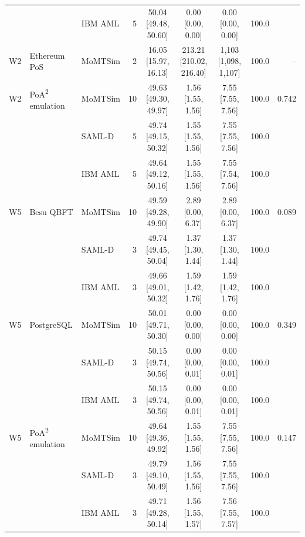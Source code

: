 \begin{table}[t]
{\begin{tabular}{lllrcccrr}
 &  & IBM AML & 5 & 50.04 [49.48, 50.60] & 0.00 [0.00, 0.00] & 0.00 [0.00, 0.00] & 100.0 &  \\
W2 & Ethereum PoS & MoMTSim & 2 & 16.05 [15.97, 16.13] & 213.21 [210.02, 216.40] & 1,103 [1,098, 1,107] & 100.0 & -- \\
W2 & PoA\textsuperscript{2} emulation & MoMTSim & 10 & 49.63 [49.30, 49.97] & 1.56 [1.55, 1.56] & 7.55 [7.55, 7.56] & 100.0 & 0.742 \\
 &  & SAML-D & 5 & 49.74 [49.15, 50.32] & 1.55 [1.55, 1.56] & 7.55 [7.55, 7.56] & 100.0 &  \\
 &  & IBM AML & 5 & 49.64 [49.12, 50.16] & 1.55 [1.55, 1.56] & 7.55 [7.54, 7.56] & 100.0 &  \\
W5 & Besu QBFT & MoMTSim & 10 & 49.59 [49.28, 49.90] & 2.89 [0.00, 6.37] & 2.89 [0.00, 6.37] & 100.0 & 0.089 \\
 &  & SAML-D & 3 & 49.74 [49.45, 50.04] & 1.37 [1.30, 1.44] & 1.37 [1.30, 1.44] & 100.0 &  \\
 &  & IBM AML & 3 & 49.66 [49.01, 50.32] & 1.59 [1.42, 1.76] & 1.59 [1.42, 1.76] & 100.0 &  \\
W5 & PostgreSQL & MoMTSim & 10 & 50.01 [49.71, 50.30] & 0.00 [0.00, 0.00] & 0.00 [0.00, 0.00] & 100.0 & 0.349 \\
 &  & SAML-D & 3 & 50.15 [49.74, 50.56] & 0.00 [0.00, 0.01] & 0.00 [0.00, 0.01] & 100.0 &  \\
 &  & IBM AML & 3 & 50.15 [49.74, 50.56] & 0.00 [0.00, 0.01] & 0.00 [0.00, 0.01] & 100.0 &  \\
W5 & PoA\textsuperscript{2} emulation & MoMTSim & 10 & 49.64 [49.36, 49.92] & 1.55 [1.55, 1.56] & 7.55 [7.55, 7.56] & 100.0 & 0.147 \\
 &  & SAML-D & 3 & 49.79 [49.10, 50.49] & 1.56 [1.55, 1.56] & 7.55 [7.55, 7.56] & 100.0 &  \\
 &  & IBM AML & 3 & 49.71 [49.28, 50.14] & 1.56 [1.55, 1.57] & 7.56 [7.55, 7.57] & 100.0 &  \\
\bottomrule
\end{tabular}}
\end{table}
